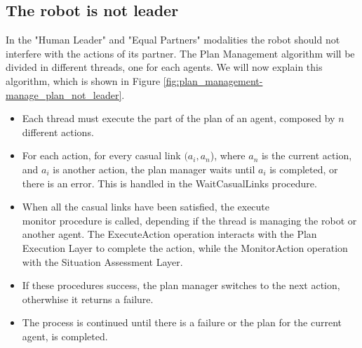 \subsection{The robot is not leader}
\label{subsec:plan_management-robot_not_leader_manager}
In the "Human Leader" and "Equal Partners" modalities the robot should not interfere with the actions of its partner. The Plan Management algorithm will be divided in different threads, one for each agents. We will now explain this algorithm, which is shown in Figure \ref{fig:plan_management-manage_plan_not_leader}.
\begin{itemize}
  \item Each thread must execute the part of the plan of an agent, composed by $n$ different actions.
  \item For each action, for every casual link $(a_i,a_n$), where $a_n$ is the current action, and $a_i$ is another action, the plan manager waits until $a_i$ is completed, or there is an error. This is handled in the WaitCasualLinks procedure.
  \item When all the casual links have been satisfied, the execute\\monitor procedure is called, depending if the thread is managing the robot or another agent. The ExecuteAction operation interacts with the Plan Execution Layer to complete the action, while the MonitorAction operation with the Situation Assessment Layer.
  \item If these procedures success, the plan manager switches to the next action, otherwhise it returns a failure.
  \item The process is continued until there is a failure or the plan for the current agent, is completed.
\end{itemize} 

